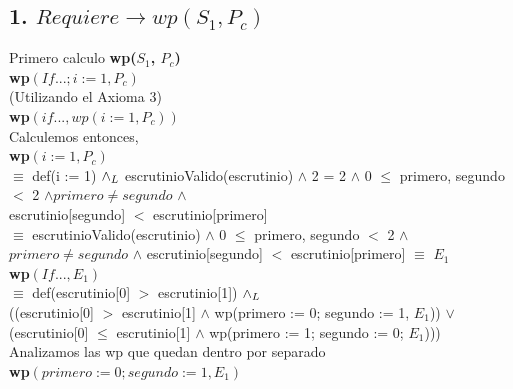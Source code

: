 \documentclass[10pt,a4paper]{article}
\begin{document}
\newpage

\subsection{1. $Requiere \rightarrow wp(S_1, P_c)$} \vspace{0.1cm}

\noindent Primero calculo \textbf{wp($S_1$, $P_c$)} \\

\noindent \textbf{wp$(If ...; i := 1, P_c)$} \\

\noindent (Utilizando el Axioma 3)\\

\noindent \textbf{wp$(if ..., wp(i:=1, P_c))$}\\

\noindent Calculemos entonces, \\

\noindent \textbf{wp$(i:=1, P_c)$} \vspace{0.1cm} \\
\noindent $\equiv$ def(i := 1) $\land _L$  escrutinioValido(escrutinio) $\land$ 2 = 2 $\land$ 0 $\leq$ primero, segundo $<$ 2 $\land  primero \neq segundo$ $\land$ \\ escrutinio[segundo] $<$ escrutinio[primero] \\
\noindent $\equiv$ escrutinioValido(escrutinio) $\land$ 0 $\leq$ primero, segundo $<$ 2 $\land$  $primero \neq segundo$ $\land$ escrutinio[segundo] $<$ escrutinio[primero]  $\equiv$ $E_1$ \\

\noindent \textbf{wp$(If... , E_1)$} \vspace{0.1cm} \\
\noindent $\equiv$ def(escrutinio[0] $>$ escrutinio[1]) $\land _L$ \\  ((escrutinio[0] $>$ escrutinio[1]  $\land$ wp(primero := 0; segundo := 1, $E_1$)) $\lor$ \\
(escrutinio[0] $\leq$ escrutinio[1] $\land$ wp(primero := 1; segundo := 0; $E_1$)))  \vspace{0.1cm} \\

\noindent Analizamos las wp que quedan dentro por separado \\

\noindent \textbf{wp$(primero := 0; segundo := 1, E_1)$} \vspace{0.1cm} \\
\end{document}

